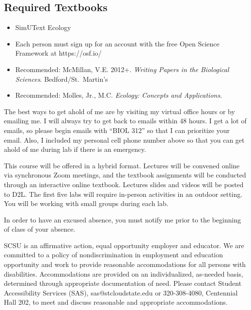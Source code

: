 \documentclass{tufte-handout}
\begin{document}
\begin{fullwidth}
\subsection{Required Textbooks}

\begin{itemize}
	\item SimUText Ecology
	\item Each person must sign up for an account with the free Open Science Framework at https://osf.io/
	\item Recommended: McMillan, V.E. 2012+. \emph{Writing Papers in the Biological Sciences}. Bedford/St.\ Martin's
	\item Recommended: Molles, Jr., M.C. \emph{Ecology: Concepts and Applications}.
\end{itemize}


 The best ways to get ahold of me are by visiting my virtual office hours or by emailing me. I will always try to get back to emails within 48 hours. I get a lot of emails, so please begin emails with ``BIOL 312'' so that I can prioritize your email. Also, I included my personal cell phone number above so that you can get ahold of me during lab if there is an emergency.

 This course will be offered in a hybrid format. Lectures will be convened online via synchronous Zoom meetings, and the textbook assignments will be conducted through an interactive online textbook. Lectures slides and videos will be posted to D2L. The first five labs will require in-person activities in an outdoor setting. You will be working with small groups during each lab. 


\color{blue}
In order to have an excused absence, you must notify me prior to the beginning of class of your absence.
\color{black}


 SCSU is an affirmative action, equal opportunity employer and educator. We are committed to a policy of nondiscrimination in employment and education opportunity and work to provide reasonable accommodations for all persons with disabilities. Accommodations are provided on an individualized, as-needed basis, determined through appropriate documentation of need. Please contact Student Accessibility Services (SAS), sas@stcloudstate.edu or 320-308-4080, Centennial Hall 202, to meet and discuss reasonable and appropriate accommodations. 


\end{fullwidth}
\end{document}
